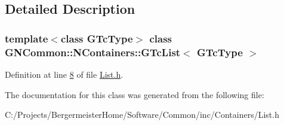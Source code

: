 \subsection{Detailed Description}
\subsubsection*{template$<$class G\+Tc\+Type$>$\newline
class G\+N\+Common\+::\+N\+Containers\+::\+G\+Tc\+List$<$ G\+Tc\+Type $>$}



Definition at line \mbox{\hyperlink{_list_8h_source_l00008}{8}} of file \mbox{\hyperlink{_list_8h_source}{List.\+h}}.



The documentation for this class was generated from the following file\+:\begin{DoxyCompactItemize}
\item 
C\+:/\+Projects/\+Bergermeister\+Home/\+Software/\+Common/inc/\+Containers/List.\+h\end{DoxyCompactItemize}
